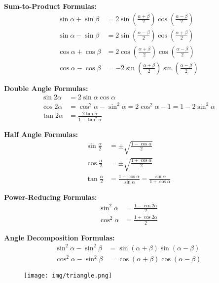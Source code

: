 \documentclass[11pt]{elegantbook}
\begin{document}
\textbf{Sum-to-Product Formulas:}
\begin{align*}
\sin\alpha + \sin\beta &= 2 \sin\left( \frac{\alpha + \beta}{2} \right) \cos\left( \frac{\alpha - \beta}{2} \right) \\
\sin\alpha - \sin\beta &= 2 \sin\left( \frac{\alpha - \beta}{2} \right) \cos\left( \frac{\alpha + \beta}{2} \right) \\
\cos\alpha + \cos\beta &= 2 \cos\left( \frac{\alpha + \beta}{2} \right) \cos\left( \frac{\alpha - \beta}{2} \right) \\
\cos\alpha - \cos\beta &= -2 \sin\left( \frac{\alpha + \beta}{2} \right) \sin\left( \frac{\alpha - \beta}{2} \right)
\end{align*}

\textbf{Double Angle Formulas:}
\begin{align*}
\sin 2\alpha &= 2\sin\alpha \cos\alpha \\
\cos 2\alpha &= \cos^2\alpha - \sin^2\alpha = 2\cos^2\alpha - 1 = 1 - 2\sin^2\alpha \\
\tan 2\alpha &= \frac{2\tan\alpha}{1 - \tan^2\alpha}
\end{align*}

\textbf{Half Angle Formulas:}
\begin{align*}
\sin \frac{\alpha}{2} &= \pm \sqrt{ \frac{1 - \cos\alpha}{2} } \\
\cos \frac{\alpha}{2} &= \pm \sqrt{ \frac{1 + \cos\alpha}{2} } \\
\tan \frac{\alpha}{2} &= \frac{1 - \cos\alpha}{\sin\alpha} = \frac{\sin\alpha}{1 + \cos\alpha}
\end{align*}

\textbf{Power-Reducing Formulas:}
\begin{align*}
\sin^2\alpha &= \frac{1 - \cos 2\alpha}{2} \\
\cos^2\alpha &= \frac{1 + \cos 2\alpha}{2}
\end{align*}

\textbf{Angle Decomposition Formulas:}
\begin{align*}
\sin^2\alpha - \sin^2\beta &= \sin(\alpha + \beta) \sin(\alpha - \beta) \\
\cos^2\alpha - \sin^2\beta &= \cos(\alpha + \beta) \cos(\alpha - \beta)
\end{align*}

\begin{figure}[h]
    \centering
    \texttt{[image: img/triangle.png]}
\end{figure}
\end{document}

